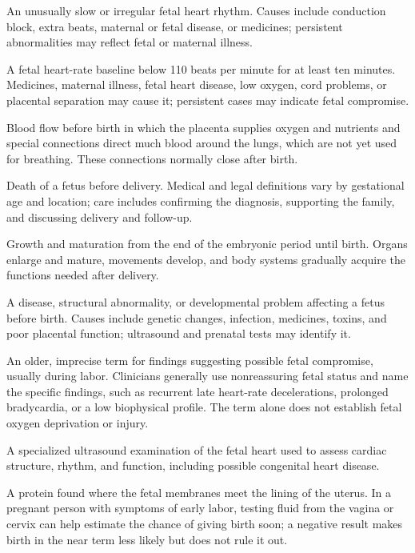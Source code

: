  An unusually slow or irregular fetal heart rhythm. Causes include conduction block, extra beats, maternal or fetal disease, or medicines; persistent abnormalities may reflect fetal or maternal illness.

 A fetal heart-rate baseline below 110 beats per minute for at least ten minutes. Medicines, maternal illness, fetal heart disease, low oxygen, cord problems, or placental separation may cause it; persistent cases may indicate fetal compromise.

 Blood flow before birth in which the placenta supplies oxygen and nutrients and special connections direct much blood around the lungs, which are not yet used for breathing. These connections normally close after birth.

 Death of a fetus before delivery. Medical and legal definitions vary by gestational age and location; care includes confirming the diagnosis, supporting the family, and discussing delivery and follow-up.

 Growth and maturation from the end of the embryonic period until birth. Organs enlarge and mature, movements develop, and body systems gradually acquire the functions needed after delivery.

 A disease, structural abnormality, or developmental problem affecting a fetus before birth. Causes include genetic changes, infection, medicines, toxins, and poor placental function; ultrasound and prenatal tests may identify it.

 An older, imprecise term for findings suggesting possible fetal compromise, usually during labor. Clinicians generally use nonreassuring fetal status and name the specific findings, such as recurrent late heart-rate decelerations, prolonged bradycardia, or a low biophysical profile. The term alone does not establish fetal oxygen deprivation or injury.

 A specialized ultrasound examination of the fetal heart used to assess cardiac structure, rhythm, and function, including possible congenital heart disease.

 A protein found where the fetal membranes meet the lining of the uterus. In a pregnant person with symptoms of early labor, testing fluid from the vagina or cervix can help estimate the chance of giving birth soon; a negative result makes birth in the near term less likely but does not rule it out.

